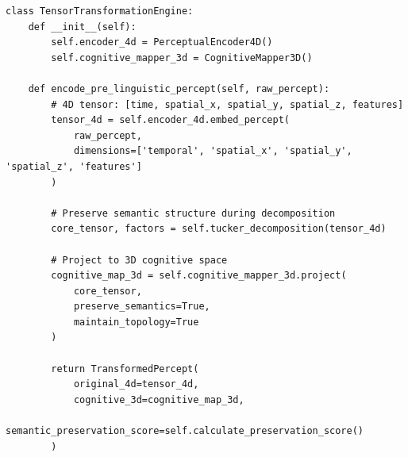 \documentclass[11pt]{article}
\theoremstyle{definition}
\begin{document}
\begin{verbatim}
class TensorTransformationEngine:
    def __init__(self):
        self.encoder_4d = PerceptualEncoder4D()
        self.cognitive_mapper_3d = CognitiveMapper3D()
        
    def encode_pre_linguistic_percept(self, raw_percept):
        # 4D tensor: [time, spatial_x, spatial_y, spatial_z, features]
        tensor_4d = self.encoder_4d.embed_percept(
            raw_percept,
            dimensions=['temporal', 'spatial_x', 'spatial_y', 'spatial_z', 'features']
        )
        
        # Preserve semantic structure during decomposition
        core_tensor, factors = self.tucker_decomposition(tensor_4d)
        
        # Project to 3D cognitive space
        cognitive_map_3d = self.cognitive_mapper_3d.project(
            core_tensor,
            preserve_semantics=True,
            maintain_topology=True
        )
        
        return TransformedPercept(
            original_4d=tensor_4d,
            cognitive_3d=cognitive_map_3d,
            semantic_preservation_score=self.calculate_preservation_score()
        )
\end{verbatim}
\end{document}
